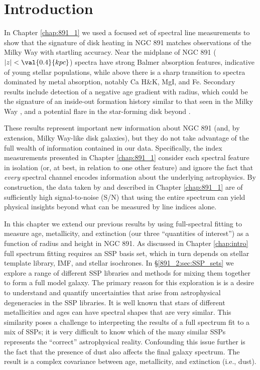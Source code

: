 \section{Introduction}

In Chapter \ref{chap:891_1} we used a focused set of spectral line
measurements to show that the signature of disk heating in NGC 891
matches observations of the Milky Way \citep[e.g.,][]{Bovy12,
  Hayden15} with startling accuracy. Near the midplane of NGC 891
($|z| < \val{0.4}{kpc}$) spectra have strong Balmer absorption
features, indicative of young stellar populations, while above
 there is a sharp transition to spectra dominated by
metal absorption, notably Ca H\&K, MgI, and Fe. Secondary results
include detection of a negative age gradient with radius, which could
be the signature of an inside-out formation history similar to that
seen in the Milky Way \citep{Bovy12, Hayden15}, and a potential flare
in the star-forming disk beyond .

These results represent important new information about NGC 891 (and,
by extension, Milky Way-like disk galaxies), but they do not take
advantage of the full wealth of information contained in our
data. Specifically, the index measurements presented in Chapter
\ref{chap:891_1} consider each spectral feature in isolation (or, at
best, in relation to one other feature) and ignore the fact that
\emph{every} spectral channel encodes information about the underlying
astrophysics. By construction, the data taken by \GP and described in
Chapter \ref{chap:891_1} are of sufficiently high signal-to-noise
(S/N) that using the entire spectrum can yield physical insights
beyond what can be measured by line indices alone.

In this chapter we extend our previous results by using full-spectral
fitting to measure age, metallicity, and extinction (our three
``quantities of interest'') as a function of radius and height in NGC
891. As discussed in Chapter \ref{chap:intro} full spectrum fitting
requires an SSP basis set, which in turn depends on stellar template
library, IMF, and stellar isochrones. In \S\ref{891_2:sec:SSP_sets} we
explore a range of different SSP libraries and methods for mixing them
together to form a full model galaxy. The primary reason for this
exploration is is a desire to understand and quantify uncertainties
that arise from astrophysical degeneracies in the SSP libraries. It is
well known \citep{Oconnel76,Aaronson78,Worthey94,dePaz02} that stars
of different metallicities and ages can have spectral shapes that are
very similar. This similarity poses a challenge to interpreting the
results of a full spectrum fit to a mix of SSPs; it is very difficult
to know which of the many similar SSPs represents the ``correct''
astrophysical reality. Confounding this issue further is the fact that
the presence of dust also affects the final galaxy spectrum. The
result is a complex covariance between age, metallicity, and
extinction (i.e., dust).

